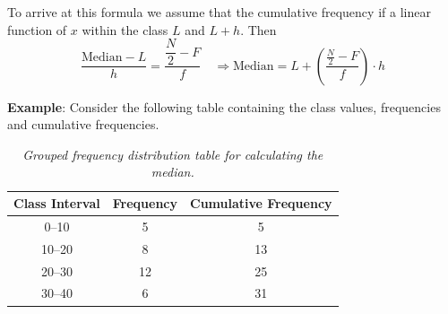 \documentclass[twoside]{book}
\begin{document}
\begin{enumerate}
To arrive at this formula we assume that the cumulative frequency if a linear function of $x$ within the class $L$ and $L+h$. Then
$$\dfrac{\text{Median} - L}{h} = \dfrac{\dfrac{N}{2}-F}{f} \quad \Rightarrow \text{Median} = L + \left( \dfrac{\frac{N}{2} - F}{f} \right) \cdot h$$

\begin{center}
\end{center}

\textbf{Example}: Consider the following table containing the class values, frequencies and cumulative frequencies.


\begin{table}[H]
\begin{center}
\begin{tabular}{c|c|c}
	\toprule
	\textbf{Class Interval} & \textbf{Frequency} & \textbf{Cumulative Frequency} \\
	\midrule
	0--10 & 5 & 5\\
	10--20 & 8 & 13\\
	20--30 & 12 & 25\\
	30--40 & 6 & 31\\
	\bottomrule
\end{tabular}
\caption{\textit{Grouped frequency distribution table for calculating the median.}}
\end{center}
\end{table}


\end{enumerate}
\end{document}
